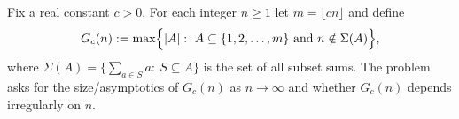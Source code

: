 Fix a real constant $c>0$. For each integer $n\ge 1$ let $m=\lfloor cn\rfloor$ and define
\[
G_c(n):=\max\Bigl\{|A|:\ A\subseteq\{1,2,\dots,m\}\ \text{and}\ n\notin \Sigma(A)\Bigr\},
\]
where $\Sigma(A)=\{\sum_{a\in S} a:\ S\subseteq A\}$ is the set of all subset sums.
The problem asks for the size/asymptotics of $G_c(n)$ as $n\to\infty$ and whether $G_c(n)$ depends irregularly on $n$.
